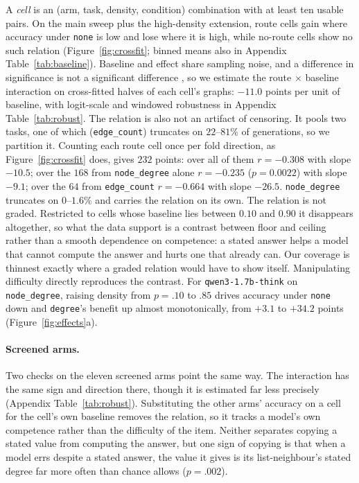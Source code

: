\documentclass[11pt]{article}
\begin{document}
A \emph{cell} is an (arm, task, density, condition) combination with at
least ten usable pairs. On the main sweep plus the high-density extension,
route cells gain where accuracy under \texttt{none} is low and lose where
it is high, while no-route cells show no such relation
(Figure~\ref{fig:crossfit}; binned means also in Appendix
Table~\ref{tab:baseline}). Baseline and effect share sampling noise, and a
difference in significance is not a significant difference
\citep{gelman2006difference}, so we estimate the route $\times$ baseline
interaction on cross-fitted halves of each cell's graphs: $-11.0$ points
per unit of baseline, with logit-scale and windowed robustness in Appendix
Table~\ref{tab:robust}. The relation is also not an artifact of censoring.
It pools two tasks, one of which (\texttt{edge\_count}) truncates on
$22$--$81\%$ of generations, so we partition it. Counting each route cell
once per fold direction, as Figure~\ref{fig:crossfit} does, gives $232$
points: over all of them $r{=}-0.308$ with slope $-10.5$; over the $168$
from \texttt{node\_degree} alone $r{=}-0.235$ ($p{=}0.0022$) with slope
$-9.1$; over the $64$ from \texttt{edge\_count} $r{=}-0.664$ with slope
$-26.5$.
\texttt{node\_degree} truncates on $0$--$1.6\%$ and carries the relation on
its own. The relation is not graded. Restricted to cells
whose baseline lies between $0.10$ and $0.90$ it disappears altogether, so
what the data support is a contrast between floor and ceiling rather than a
smooth dependence on competence: a stated answer helps a model that cannot
compute the answer and hurts one that already can. Our coverage is thinnest
exactly where a graded relation would have to show itself. Manipulating
difficulty directly reproduces the contrast. For
\texttt{qwen3-1.7b-think} on \texttt{node\_degree}, raising density from
$p{=}.10$ to $.85$ drives accuracy under \texttt{none} down and
\texttt{degree}'s benefit up almost monotonically, from $+3.1$ to $+34.2$
points (Figure~\ref{fig:effects}a).

\paragraph{Screened arms.}
\label{sec:results-heldout}
Two checks on the eleven screened arms point the same way. The
interaction has the same sign and direction there, though it is estimated
far less precisely (Appendix Table~\ref{tab:robust}). Substituting the
other arms' accuracy on a cell for the cell's own baseline removes the
relation, so it tracks a model's own competence rather than the difficulty
of the item. Neither separates copying a stated value
from computing the answer, but one sign of copying is that when a model
errs despite a stated answer, the value it gives is its list-neighbour's
stated degree far more often than chance allows ($p{=}.002$).
\end{document}

